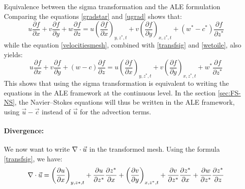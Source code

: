 \begin{CommentBlock}{Equivalence between the sigma transformation and the ALE formulation}
Comparing the equations \eqref{gradstar} and \eqref{ugrad} shows that:%
\begin{equation}
u\dfrac{\partial f}{\partial x}
+v\dfrac{\partial f}{\partial y}
+w\dfrac{\partial f}{\partial z}
= u\left(\dfrac{\partial f}{\partial x}\right)_{y,z^*,t}
+v\left(\dfrac{\partial f}{\partial y}\right)_{x,z^*,t}
+(w^{\ast}-c^{\ast})\dfrac{\partial f}{\partial z^{\ast}}
\end{equation}
while the equation \eqref{velocitiesmesh}, combined with \eqref{transfsig} and \eqref{wetoile}, also yields:%
\begin{equation}
u\dfrac{\partial f}{\partial x}
+v\dfrac{\partial f}{\partial y}
+(w-c)\dfrac{\partial f}{\partial z}
=u\left(\dfrac{\partial f}{\partial x}\right)_{y,z^*,t}
+v\left(\dfrac{\partial f}{\partial y}\right)_{x,z^*,t}
+w^{\ast}\dfrac{\partial f}{\partial z^{\ast}}
\end{equation}
This shows that using the sigma transformation is equivalent to writing the equations in the ALE framework
at the continuous level. In the section \ref{sec:FS-NS}, the Navier--Stokes
equations will thus be written in the ALE framework,
using $\vec{u}-\vec{c}$ instead of $\vec{u}$ for the advection terms.
\end{CommentBlock}

\paragraph{Divergence:%
%
}

We now want to write $\nabla \cdot \vec{u}$ in the transformed mesh. Using
the formula \eqref{transfsig}, we have:%
\begin{equation}
\nabla \cdot\vec{u}=\left(\dfrac{\partial u}{\partial x}\right)_{y,z\ast,t}
+\dfrac{\partial u}{\partial z^{\ast}}\dfrac{\partial z^{\ast}}{\partial x}
+\left(\dfrac{\partial v}{\partial y}\right)_{x,z^{\ast},t}
+\dfrac{\partial v}{\partial z^{\ast}}\dfrac{\partial z^{\ast}}{\partial x}
+\dfrac{\partial w}{\partial z^{\ast}}\dfrac{\partial z^{\ast}}{\partial z}
\end{equation}


